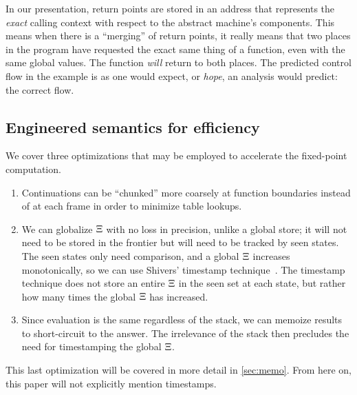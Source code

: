 In our presentation, return points are stored in an address that represents the \emph{exact} calling context with respect to the abstract machine's components.
%
This means when there is a ``merging'' of return points, it really means that two places in the program have requested the exact same thing of a function, even with the same global values.
%
The function \emph{will} return to both places.
%
The predicted control flow in the example is as one would expect, or \emph{hope}, an analysis would predict: the correct flow.

\subsection{Engineered semantics for efficiency}\label{sec:eng-frontier}
We cover three optimizations that may be employed to accelerate the fixed-point computation.
\begin{enumerate}
\item{\label{item:chunk}Continuations can be ``chunked'' more coarsely at function boundaries instead of at each frame in order to minimize table lookups.}
\item{We can globalize $\Xi$ with no loss in precision, unlike a global store;%
      it will not need to be stored in the frontier but will need to be tracked by seen states.
%
      The seen states only need comparison, and a global $\Xi$ increases monotonically, so we can use Shivers' timestamp technique~\citep{ianjohnson:Shivers:1991:CFA}.
%
      The timestamp technique does not store an entire $\Xi$ in the seen set at each state, but rather how many times the global $\Xi$ has increased.}
\item{Since evaluation is the same regardless of the stack, we can memoize results to short-circuit to the answer.
      The irrelevance of the stack then precludes the need for timestamping the global $\Xi$.}
\end{enumerate}
%
This last optimization will be covered in more detail in \autoref{sec:memo}.
%
From here on, this paper will not explicitly mention timestamps.

